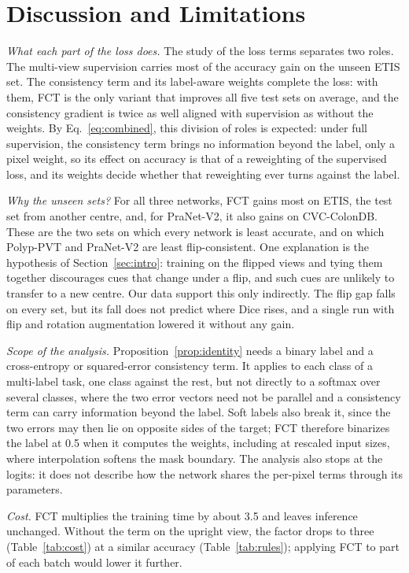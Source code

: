 \section{Discussion and Limitations}
\label{sec:discussion}

\textit{What each part of the loss does.} The study of the loss terms separates two roles. The
multi-view supervision carries most of the accuracy gain on the unseen ETIS set. The consistency term
and its label-aware weights complete the loss: with them, FCT is the only variant that improves all
five test sets on average, and the consistency gradient is twice as well aligned with supervision as
without the weights. By
Eq.~\eqref{eq:combined}, this division of roles is expected: under full supervision, the consistency
term brings no information beyond the label, only a pixel weight, so its effect on accuracy is that
of a reweighting of the supervised loss, and its weights decide whether that reweighting ever turns
against the label.

\textit{Why the unseen sets?} For all three networks, FCT gains most on ETIS, the test set from
another centre, and, for PraNet-V2, it also gains on CVC-ColonDB. These are the two sets on which every
network is least accurate, and on which Polyp-PVT and PraNet-V2 are least flip-consistent. One
explanation is the hypothesis of Section~\ref{sec:intro}: training on the flipped views and tying them
together discourages cues that change under a flip, and such cues are unlikely to transfer to a new
centre. Our data support this only indirectly. The flip gap falls on every set, but its fall does not
predict where Dice rises, and a single run with flip and rotation augmentation lowered it without any
gain.

\textit{Scope of the analysis.} Proposition~\ref{prop:identity} needs a binary label and a
cross-entropy or squared-error consistency term. It applies to each class of a multi-label task, one
class against the rest, but not directly to a softmax over several classes, where the two error vectors
need not be parallel and a consistency term can carry information beyond the label. Soft labels also
break it, since the two errors may then lie on opposite sides of the target; FCT therefore binarizes the
label at 0.5 when it computes the weights, including at rescaled input sizes, where interpolation
softens the mask boundary. The analysis also stops at the logits: it does not describe how the network
shares the per-pixel terms through its parameters.

\textit{Cost.} FCT multiplies the training time by about 3.5 and leaves inference unchanged. Without
the term on the upright view, the factor drops to three (Table~\ref{tab:cost}) at a similar accuracy
(Table~\ref{tab:rules}); applying FCT to part of each batch would lower it further.

